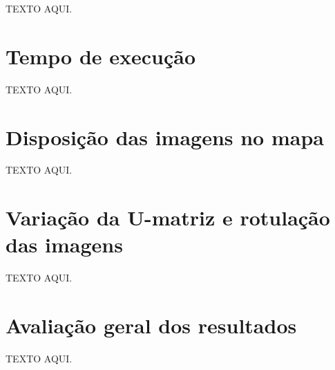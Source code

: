 TEXTO AQUI.

\section{Tempo de execução}

TEXTO AQUI.

\section{Disposição das imagens no mapa}

TEXTO AQUI.

\section{Variação da U-matriz e rotulação das imagens}

TEXTO AQUI.

\section{Avaliação geral dos resultados}

TEXTO AQUI.
